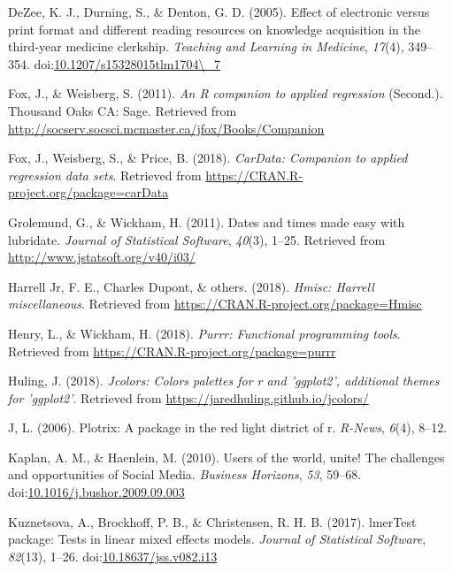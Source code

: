 \documentclass[man, fleqn, noextraspace]{apa6}
\theoremstyle{definition}
\theoremstyle{definition}
\theoremstyle{definition}
\theoremstyle{remark}
\begin{document}
\hypertarget{ref-DeZee2005}{}
DeZee, K. J., Durning, S., \& Denton, G. D. (2005). Effect of electronic
versus print format and different reading resources on knowledge
acquisition in the third-year medicine clerkship. \emph{Teaching and
Learning in Medicine}, \emph{17}(4), 349--354.
doi:\href{https://doi.org/10.1207/s15328015tlm1704/_7}{10.1207/s15328015tlm1704\textbackslash{}\_7}

\hypertarget{ref-R-car}{}
Fox, J., \& Weisberg, S. (2011). \emph{An R companion to applied
regression} (Second.). Thousand Oaks CA: Sage. Retrieved from
\url{http://socserv.socsci.mcmaster.ca/jfox/Books/Companion}

\hypertarget{ref-R-carData}{}
Fox, J., Weisberg, S., \& Price, B. (2018). \emph{CarData: Companion to
applied regression data sets}. Retrieved from
\url{https://CRAN.R-project.org/package=carData}

\hypertarget{ref-R-lubridate}{}
Grolemund, G., \& Wickham, H. (2011). Dates and times made easy with
lubridate. \emph{Journal of Statistical Software}, \emph{40}(3), 1--25.
Retrieved from \url{http://www.jstatsoft.org/v40/i03/}

\hypertarget{ref-R-Hmisc}{}
Harrell Jr, F. E., Charles Dupont, \& others. (2018). \emph{Hmisc:
Harrell miscellaneous}. Retrieved from
\url{https://CRAN.R-project.org/package=Hmisc}

\hypertarget{ref-R-purrr}{}
Henry, L., \& Wickham, H. (2018). \emph{Purrr: Functional programming
tools}. Retrieved from \url{https://CRAN.R-project.org/package=purrr}

\hypertarget{ref-R-jcolors}{}
Huling, J. (2018). \emph{Jcolors: Colors palettes for r and 'ggplot2',
additional themes for 'ggplot2'}. Retrieved from
\url{https://jaredhuling.github.io/jcolors/}

\hypertarget{ref-R-plotrix}{}
J, L. (2006). Plotrix: A package in the red light district of r.
\emph{R-News}, \emph{6}(4), 8--12.

\hypertarget{ref-Kaplan2010}{}
Kaplan, A. M., \& Haenlein, M. (2010). Users of the world, unite! The
challenges and opportunities of Social Media. \emph{Business Horizons},
\emph{53}, 59--68.
doi:\href{https://doi.org/10.1016/j.bushor.2009.09.003}{10.1016/j.bushor.2009.09.003}

\hypertarget{ref-R-lmerTest}{}
Kuznetsova, A., Brockhoff, P. B., \& Christensen, R. H. B. (2017).
lmerTest package: Tests in linear mixed effects models. \emph{Journal of
Statistical Software}, \emph{82}(13), 1--26.
doi:\href{https://doi.org/10.18637/jss.v082.i13}{10.18637/jss.v082.i13}
\end{document}
